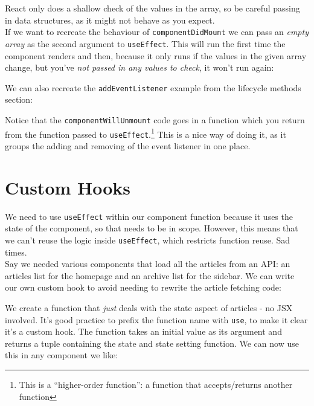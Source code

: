 
React only does a shallow check of the values in the array, so be careful passing in data structures, as it might not behave as you expect.
\\

If we want to recreate the behaviour of \texttt{componentDidMount} we can pass an \textit{empty array} as the second argument to \texttt{useEffect}. This will run the first time the component renders and then, because it only runs if the values in the given array change, but you've \textit{not passed in any values to check}, it won't run again:



We can also recreate the \texttt{addEventListener} example from the lifecycle methods section:



Notice that the \texttt{componentWillUnmount} code goes in a function which you return from the function passed to \texttt{useEffect}.\footnote{This is a ``higher-order function'': a function that accepts/returns another function} This is a nice way of doing it, as it groups the adding and removing of the event listener in one place.


\section{Custom Hooks}

We need to use \texttt{useEffect} within our component function because it uses the state of the component, so that needs to be in scope. However, this means that we can't reuse the logic inside \texttt{useEffect}, which restricts function reuse. Sad times.
\\

Say we needed various components that load all the articles from an API: an articles list for the homepage and an archive list for the sidebar. We can write our own custom hook to avoid needing to rewrite the article fetching code:


We create a function that \textit{just} deals with the state aspect of articles - no JSX involved. It's good practice to prefix the function name with \texttt{use}, to make it clear it's a custom hook. The function takes an initial value as its argument and returns a tuple containing the state and state setting function. We can now use this in any component we like:

